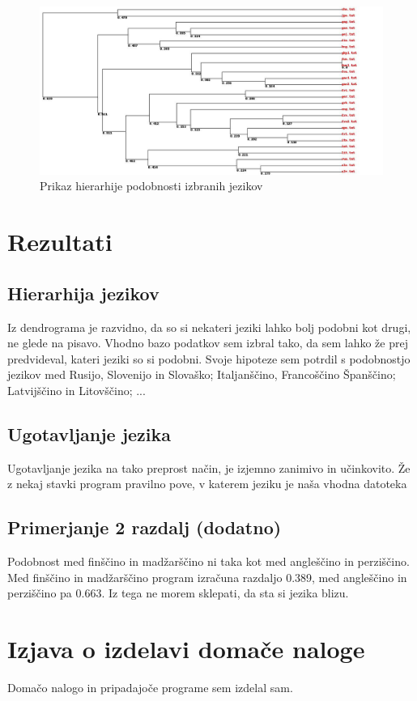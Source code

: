 \documentclass[a4paper,11pt]{article}
\begin{document}
\begin{figure}[htbp]
\begin{center}
\includegraphics[scale=0.4]{languageGroup-dendrogram.jpg}
\caption{Prikaz hierarhije podobnosti izbranih jezikov}
\label{slika1}
\end{center}
\end{figure}

\section{Rezultati}

\subsection{Hierarhija jezikov}
Iz dendrograma je razvidno, da so si nekateri jeziki lahko bolj podobni kot drugi, ne glede na pisavo. Vhodno bazo podatkov sem izbral tako, da sem lahko že prej predvideval, kateri jeziki so si podobni. Svoje hipoteze sem potrdil s podobnostjo jezikov med Rusijo, Slovenijo in Slovaško; Italjanščino, Francoščino Španščino; Latvijščino in Litovščino; ...
\subsection{Ugotavljanje jezika}
Ugotavljanje jezika na tako preprost način, je izjemno zanimivo in učinkovito. Že z nekaj stavki program pravilno pove, v katerem jeziku je naša vhodna datoteka 
\subsection{Primerjanje 2 razdalj (dodatno)}
Podobnost med finščino in madžarščino ni taka kot med angleščino in perziščino. Med finščino in madžarščino program izračuna razdaljo 0.389, med angleščino in perziščino pa 0.663. Iz tega ne morem sklepati, da sta si jezika blizu. 

\section{Izjava o izdelavi domače naloge}
Domačo nalogo in pripadajoče programe sem izdelal sam.
\end{document}
